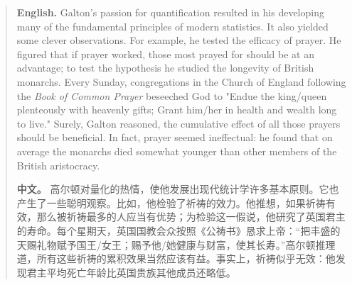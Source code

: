 \begin{quote}
\noindent\textbf{English.} Galton's passion for quantification resulted in his developing many of the fundamental principles of modern statistics. It also yielded some clever observations. For example, he tested the efficacy of prayer. He figured that if prayer worked, those most prayed for should be at an advantage; to test the hypothesis he studied the longevity of British monarchs. Every Sunday, congregations in the Church of England following the \emph{Book of Common Prayer} beseeched God to "Endue the king/queen plenteously with heavenly gifts; Grant him/her in health and wealth long to live." Surely, Galton reasoned, the cumulative effect of all those prayers should be beneficial. In fact, prayer seemed ineffectual: he found that on average the monarchs died somewhat younger than other members of the British aristocracy.

\smallskip
\noindent\textbf{中文。} 高尔顿对量化的热情，使他发展出现代统计学许多基本原则。它也产生了一些聪明观察。比如，他检验了祈祷的效力。他推想，如果祈祷有效，那么被祈祷最多的人应当有优势；为检验这一假说，他研究了英国君主的寿命。每个星期天，英国国教会众按照《公祷书》恳求上帝：“把丰盛的天赐礼物赋予国王/女王；赐予他/她健康与财富，使其长寿。”高尔顿推理道，所有这些祈祷的累积效果当然应该有益。事实上，祈祷似乎无效：他发现君主平均死亡年龄比英国贵族其他成员还略低。
\end{quote}

